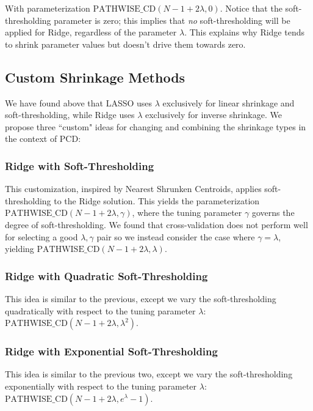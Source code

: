 \documentclass[11pt]{article}
\newcommand{\pcd}{\text{PATHWISE\_CD}}
\begin{document}
With parameterization $\pcd(N-1+2\lambda,0)$.  Notice that the soft-thresholding parameter is zero; this implies that \textit{no} soft-thresholding will be applied for Ridge, regardless of the parameter $\lambda$.  This explains why Ridge tends to shrink parameter values but doesn't drive them towards zero.  

\subsection{Custom Shrinkage Methods}
We have found above that LASSO uses $\lambda$ exclusively for linear shrinkage and soft-thresholding, while Ridge uses $\lambda$ exclusively for inverse shrinkage.  We propose three ``custom" ideas for changing and combining the shrinkage types in the context of PCD:

\subsubsection{Ridge with Soft-Thresholding}
This customization, inspired by Nearest Shrunken Centroids, applies soft-thresholding to the Ridge solution.  This yields the parameterization $\pcd(N-1 + 2\lambda, \gamma)$, where the tuning parameter $\gamma$ governs the degree of soft-thresholding.  We found that cross-validation does not perform well for selecting a good $\lambda, \gamma$ pair so we instead consider the case where $\gamma=\lambda$, yielding $\pcd(N-1 + 2\lambda, \lambda)$.  

\subsubsection{Ridge with Quadratic Soft-Thresholding}
This idea is similar to the previous, except we vary the soft-thresholding quadratically with respect to the tuning parameter $\lambda$: $\pcd(N-1 + 2\lambda, \lambda^2)$.  

\subsubsection{Ridge with Exponential Soft-Thresholding}
This idea is similar to the previous two, except we vary the soft-thresholding exponentially with respect to the tuning parameter $\lambda$: $\pcd(N-1 + 2\lambda, e^\lambda-1)$.  
\end{document}
